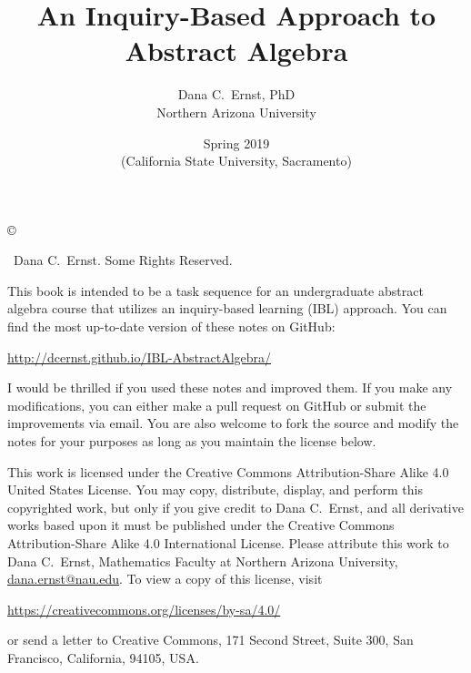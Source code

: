 \documentclass[12pt,oneside]{book}
\theoremstyle{definition}
\begin{document}
\title{An Inquiry-Based Approach to Abstract Algebra}
\author{Dana C.~Ernst, PhD\\
Northern Arizona University}
\date{Spring 2019\\ (California State University, Sacramento)}

\maketitle

\noindent\copyright{ \the\year\ Dana C.~Ernst.  Some Rights Reserved.\\

\bigskip

\noindent This book is intended to be a task sequence for an undergraduate abstract algebra course that utilizes an inquiry-based learning (IBL) approach.  You can find the most up-to-date version of these notes on GitHub:
\begin{center}
\url{http://dcernst.github.io/IBL-AbstractAlgebra/}
\end{center}
I would be thrilled if you used these notes and improved them. If you make any modifications, you can either make a pull request on GitHub or submit the improvements via email.  You are also welcome to fork the source and modify the notes for your purposes as long as you maintain the license below.

\bigskip

\noindent This work is licensed under the Creative Commons Attribution-Share Alike 4.0 United States License.  You may copy, distribute, display, and perform this copyrighted work, but only if you give credit to Dana C.~Ernst, and all derivative works based upon it must be published under the Creative Commons Attribution-Share Alike 4.0 International License. Please attribute this work to Dana C.~Ernst, Mathematics Faculty at Northern Arizona University, \url{dana.ernst@nau.edu}. To view a copy of this license, visit
\begin{center}
\url{https://creativecommons.org/licenses/by-sa/4.0/}
\end{center}
or send a letter to Creative Commons, 171 Second Street, Suite 300, San Francisco, California, 94105, USA.}

\medskip

\begin{center}
\ccbysa
\end{center}
\end{document}

